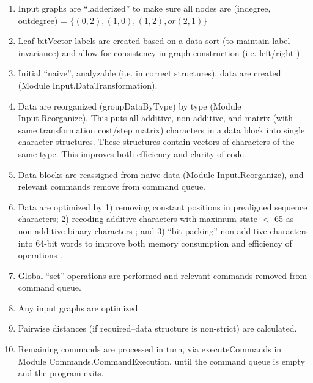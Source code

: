 \documentclass[11pt]{article}
\begin{document}
\begin{enumerate}
		\item{Input graphs are ``ladderized'' to make sure all nodes are (indegree, outdegree) = $\{(0,2), (1,0), (1,2), or (2,1)\}$}
		
		\item{Leaf bitVector labels are created based on a data sort (to maintain label invariance) and allow for consistency 
			in graph construction (i.e. left/right \cite{WashburnandWheeler2020})}
		
		\item{Initial ``naive'', analyzable (i.e. in correct structures), data are created (Module Input.DataTransformation).}
		
		
		\item{Data are reorganized (groupDataByType) by type (Module Input.Reorganize).  This puts all additive, non-additive, and matrix (with same 
			transformation cost/step matrix) characters in a data block into single character structures.  These structures contain vectors of 
			characters of the same type.  
			This improves both efficiency and clarity of code.} 
		
		\item{Data blocks are reassigned from naive data (Module Input.Reorganize), and relevant commands remove from command queue.}
		
		\item{Data are optimized by 1) removing constant positions in prealigned sequence characters; 2) recoding additive characters with maximum state $<$ 65 
			 as non-additive binary characters \cite{Farris1970}; and 3) ``bit packing'' non-additive characters into 64-bit words to improve both memory consumption
			 and efficiency of operations \cite{Ronquist1998, moilanen1999, goloboff2002, WhiteandHolland2011}.}
		
		\item{Global ``set'' operations are performed and relevant commands
			removed from command queue.}
		
		\item{Any input graphs are optimized}
		
		\item{Pairwise distances (if required--data structure is non-strict) are calculated.}
		
		\item{Remaining commands are processed in turn, via executeCommands in Module 
			Commands.CommandExecution, until the command queue is empty
			and the program exits.}
		
	\end{enumerate} 
	
\end{document}
